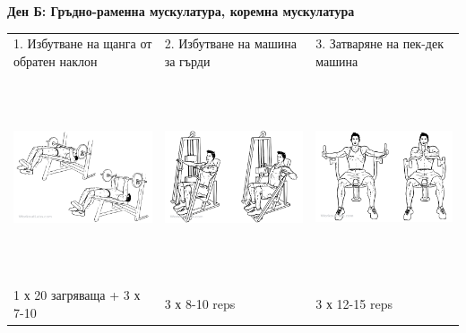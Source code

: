 \documentclass{article}
\begin{document}
\newpage
\textbf{Ден Б: Гръдно-раменна мускулатура, коремна мускулатура}\\
\begin{tabular}{ | m{5cm} | m{5cm} | m{5cm} | }
\hline
1. Избутване на щанга от обратен наклон  & 
2. Избутване на машина за гърди & 
3. Затваряне на пек-дек машина\\ 
\begin{minipage}{5cm} \includegraphics[width=\linewidth, height=60mm]{Decline_Barbell_Bench_Press.png} \end{minipage}&
\begin{minipage}{5cm} \includegraphics[width=\linewidth, height=60mm]{Hammer_Strength_Machine_Chest.png} \end{minipage}& 
\begin{minipage}{5cm} \includegraphics[width=\linewidth, height=60mm]{Butterfly.png} \end{minipage}\\ 
1 х 20 загряваща + 3 х 7-10 &  3 х 8-10 reps & 3 х 12-15 reps \\
\hline
\end{tabular}
\end{document}
